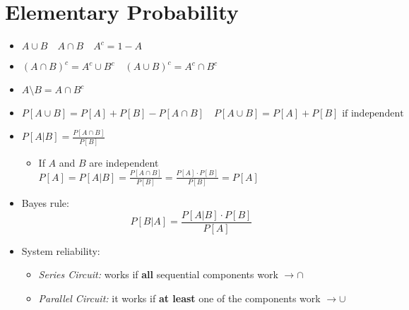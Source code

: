 \chapter{Elementary Probability}
\begin{itemize}
    \item $A \cup B \quad A \cap B \quad A^c = 1 - A$
    \item $(A \cap B)^c = A^c \cup B^c \quad (A \cup B)^c = A^c \cap B^c$
    \item $A \setminus B = A \cap B^c$
    \item $P[A \cup B] = P[A] + P[B] - P[A \cap B] \quad P[A \cup B] = P[A] + P[B] \text{ if independent}$
    \item $P[A|B] = \frac{P[A \cap B]}{P[B]}$
    \begin{itemize}
        \item If $A$ and $B$ are independent$P[A] = P[A|B] = \frac{P[A \cap B]}{P[B]} = \frac{P[A] \cdot P[B]}{P[B]} = P[A]$
    \end{itemize}
    \item Bayes rule:
    $$P[B|A] = \frac{P[A|B] \cdot P[B]}{P[A]}$$
    \item System reliability:
    \begin{itemize}
        \item \textit{Series Circuit:} works if \textbf{all} sequential components work $ \rightarrow \cap$
        \item \textit{Parallel Circuit:} it works if \textbf{at least} one of the components work $\rightarrow \cup$
    \end{itemize}
\end{itemize}